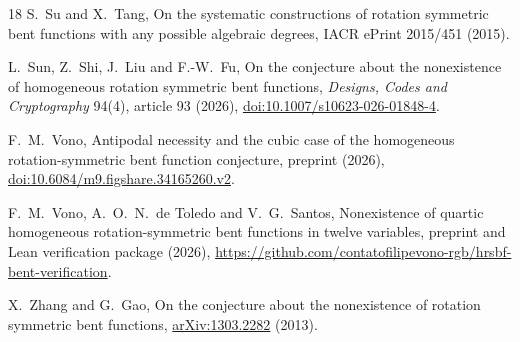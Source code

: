 \documentclass[11pt,a4paper]{article}
\theoremstyle{definition}
\begin{document}
\begin{thebibliography}{18}
S.~Su and X.~Tang, On the systematic constructions of rotation symmetric bent functions with any possible algebraic degrees, IACR ePrint 2015/451 (2015).

L.~Sun, Z.~Shi, J.~Liu and F.-W.~Fu, On the conjecture about the nonexistence of homogeneous rotation symmetric bent functions, \emph{Designs, Codes and Cryptography} 94(4), article 93 (2026), \href{https://doi.org/10.1007/s10623-026-01848-4}{doi:10.1007/s10623-026-01848-4}.

F.~M.~Vono, Antipodal necessity and the cubic case of the homogeneous rotation-symmetric bent function conjecture, preprint (2026), \href{https://doi.org/10.6084/m9.figshare.34165260.v2}{doi:10.6084/m9.figshare.34165260.v2}.

F.~M.~Vono, A.~O.~N.~de Toledo and V.~G.~Santos, Nonexistence of quartic homogeneous rotation-symmetric bent functions in twelve variables, preprint and Lean verification package (2026), \url{https://github.com/contatofilipevono-rgb/hrsbf-bent-verification}.

X.~Zhang and G.~Gao, On the conjecture about the nonexistence of rotation symmetric bent functions, \href{https://arxiv.org/abs/1303.2282}{arXiv:1303.2282} (2013).
\end{thebibliography}
\end{document}

